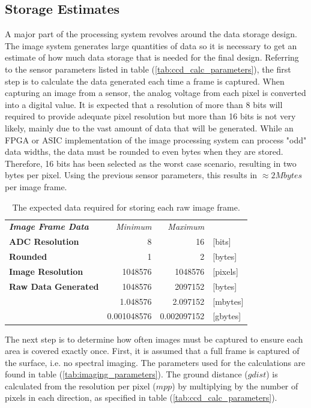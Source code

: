 \subsection{Storage Estimates}
A major part of the processing system revolves around the data storage design. The image system generates large quantities of data so it is necessary to get an estimate of how much data storage that is needed for the final design. Referring to the sensor parameters listed in table (\ref{tab:ccd_calc_parameters}), the first step is to calculate the data generated each time a frame is captured. When capturing an image from a sensor, the analog voltage from each pixel is converted into a digital value. It is expected that a resolution of more than 8 bits will required to provide adequate pixel resolution but more than 16 bits is not very likely, mainly due to the vast amount of data that will be generated. While an FPGA or ASIC implementation of the image processing system can process "odd" data widths, the data must be rounded to even bytes when they are stored. Therefore, 16 bits has been selected as the worst case scenario, resulting in two bytes per pixel. Using the previous sensor parameters, this results in $\approx 2 Mbytes$ per image frame.
\begin{table}[htb!]
  \centering
\begin{tabular}{l|r|r|l}
\textit{\textbf{Image Frame Data}} & \textit{Minimum} & \multicolumn{1}{r}{\textit{Maximum}} &  \bigstrut[b]\\
\cline{1-3}\textbf{ADC Resolution} & 8     & 16    & [bits] \bigstrut[t]\\
\textbf{Rounded} & 1     & 2     & [bytes] \bigstrut[b]\\
\cline{1-3}\textbf{Image Resolution} & 1048576 & 1048576 & [pixels] \bigstrut\\
\cline{1-3}\textbf{Raw Data Generated} & 1048576 & 2097152 & [bytes] \bigstrut[t]\\
      & 1.048576 & 2.097152 & [mbytes] \\
      & 0.001048576 & 0.002097152 & [gbytes] \\
\end{tabular}%
    \caption{The expected data required for storing each raw image frame.}
  \label{tab:img_frame_data}%
\end{table}%
The next step is to determine how often images must be captured to ensure each area is covered exactly once. First, it is assumed that a full frame is captured of the surface, i.e. no spectral imaging. The parameters used for the calculations are found in table (\ref{tab:imaging_parameters}). The ground distance ($gdist$) is calculated from the resolution per pixel ($mpp$) by multiplying by the number of pixels in each direction, as specified in table (\ref{tab:ccd_calc_parameters}).
